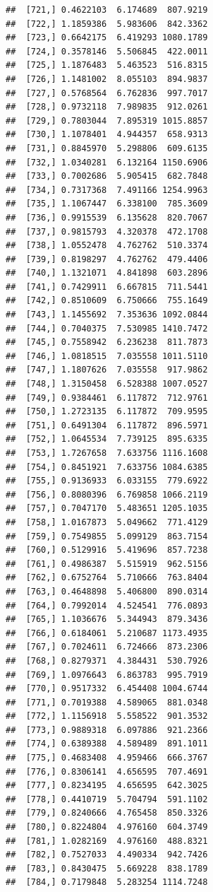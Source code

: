 \documentclass[article]{jss}\usepackage[]{graphicx}\usepackage[]{xcolor}
\makeatletter
\newenvironment{kframe}{%
 \def\at@end@of@kframe{}%
 \ifinner\ifhmode%
  \def\at@end@of@kframe{\end{minipage}}%
  \begin{minipage}{\columnwidth}%
 \fi\fi%
 \def\FrameCommand##1{\hskip\@totalleftmargin \hskip-\fboxsep
 \colorbox{shadecolor}{##1}\hskip-\fboxsep
     \hskip-\linewidth \hskip-\@totalleftmargin \hskip\columnwidth}%
 \MakeFramed {\advance\hsize-\width
   \@totalleftmargin\z@ \linewidth\hsize
   \@setminipage}}%
 {\par\unskip\endMakeFramed%
 \at@end@of@kframe}
\newenvironment{knitrout}{}{} %
\makeatother
\begin{document}
\begin{knitrout}
\begin{kframe}
\begin{verbatim}
##  [721,] 0.4622103  6.174689  807.9219
##  [722,] 1.1859386  5.983606  842.3362
##  [723,] 0.6642175  6.419293 1080.1789
##  [724,] 0.3578146  5.506845  422.0011
##  [725,] 1.1876483  5.463523  516.8315
##  [726,] 1.1481002  8.055103  894.9837
##  [727,] 0.5768564  6.762836  997.7017
##  [728,] 0.9732118  7.989835  912.0261
##  [729,] 0.7803044  7.895319 1015.8857
##  [730,] 1.1078401  4.944357  658.9313
##  [731,] 0.8845970  5.298806  609.6135
##  [732,] 1.0340281  6.132164 1150.6906
##  [733,] 0.7002686  5.905415  682.7848
##  [734,] 0.7317368  7.491166 1254.9963
##  [735,] 1.1067447  6.338100  785.3609
##  [736,] 0.9915539  6.135628  820.7067
##  [737,] 0.9815793  4.320378  472.1708
##  [738,] 1.0552478  4.762762  510.3374
##  [739,] 0.8198297  4.762762  479.4406
##  [740,] 1.1321071  4.841898  603.2896
##  [741,] 0.7429911  6.667815  711.5441
##  [742,] 0.8510609  6.750666  755.1649
##  [743,] 1.1455692  7.353636 1092.0844
##  [744,] 0.7040375  7.530985 1410.7472
##  [745,] 0.7558942  6.236238  811.7873
##  [746,] 1.0818515  7.035558 1011.5110
##  [747,] 1.1807626  7.035558  917.9862
##  [748,] 1.3150458  6.528388 1007.0527
##  [749,] 0.9384461  6.117872  712.9761
##  [750,] 1.2723135  6.117872  709.9595
##  [751,] 0.6491304  6.117872  896.5971
##  [752,] 1.0645534  7.739125  895.6335
##  [753,] 1.7267658  7.633756 1116.1608
##  [754,] 0.8451921  7.633756 1084.6385
##  [755,] 0.9136933  6.033155  779.6922
##  [756,] 0.8080396  6.769858 1066.2119
##  [757,] 0.7047170  5.483651 1205.1035
##  [758,] 1.0167873  5.049662  771.4129
##  [759,] 0.7549855  5.099129  863.7154
##  [760,] 0.5129916  5.419696  857.7238
##  [761,] 0.4986387  5.515919  962.5156
##  [762,] 0.6752764  5.710666  763.8404
##  [763,] 0.4648898  5.406800  890.0314
##  [764,] 0.7992014  4.524541  776.0893
##  [765,] 1.1036676  5.344943  879.3436
##  [766,] 0.6184061  5.210687 1173.4935
##  [767,] 0.7024611  6.724666  873.2306
##  [768,] 0.8279371  4.384431  530.7926
##  [769,] 1.0976643  6.863783  995.7919
##  [770,] 0.9517332  6.454408 1004.6744
##  [771,] 0.7019388  4.589065  881.0348
##  [772,] 1.1156918  5.558522  901.3532
##  [773,] 0.9889318  6.097886  921.2366
##  [774,] 0.6389388  4.589489  891.1011
##  [775,] 0.4683408  4.959466  666.3767
##  [776,] 0.8306141  4.656595  707.4691
##  [777,] 0.8234195  4.656595  642.3025
##  [778,] 0.4410719  5.704794  591.1102
##  [779,] 0.8240666  4.765458  850.3326
##  [780,] 0.8224804  4.976160  604.3749
##  [781,] 1.0282169  4.976160  488.8321
##  [782,] 0.7527033  4.490334  942.7426
##  [783,] 0.8430475  5.669228  838.1789
##  [784,] 0.7179848  5.283254 1114.7248

\end{verbatim}
\end{kframe}
\end{knitrout}
\end{document}

